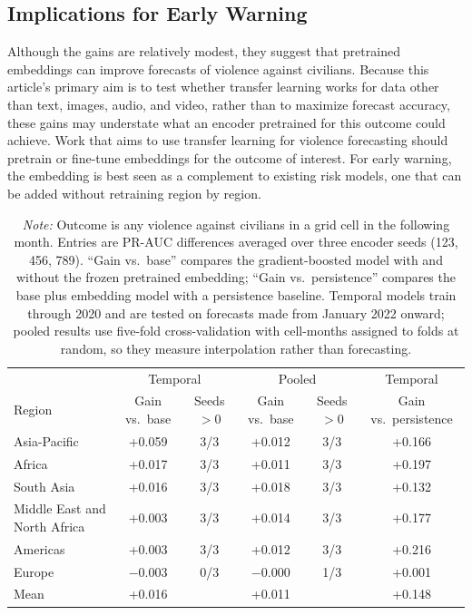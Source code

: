 \documentclass[11pt, letterpaper]{article}
\begin{document}
\subsection{Implications for Early Warning}
Although the gains are relatively modest, they suggest that pretrained embeddings can improve forecasts of violence against civilians. Because this article's primary aim is to test whether transfer learning works for data other than text, images, audio, and video, rather than to maximize forecast accuracy, these gains may understate what an encoder pretrained for this outcome could achieve. Work that aims to use transfer learning for violence forecasting should pretrain or fine-tune embeddings for the outcome of interest. For early warning, the embedding is best seen as a complement to existing risk models, one that can be added without retraining region by region.

\begin{table}[!htbp]
\centering
\caption{Embedding Gain for Forecasting Violence Against Civilians}
\label{tab:civilian_remap}
\begin{tabular}{lccccc}
\hline
& \multicolumn{2}{c}{Temporal} & \multicolumn{2}{c}{Pooled} & Temporal \\
Region & Gain vs.\ base & Seeds $>0$ & Gain vs.\ base & Seeds $>0$ & Gain vs.\ persistence \\
\hline
Asia-Pacific & +0.059 & 3/3 & +0.012 & 3/3 & +0.166 \\
Africa & +0.017 & 3/3 & +0.011 & 3/3 & +0.197 \\
South Asia & +0.016 & 3/3 & +0.018 & 3/3 & +0.132 \\
Middle East and North Africa & +0.003 & 3/3 & +0.014 & 3/3 & +0.177 \\
Americas & +0.003 & 3/3 & +0.012 & 3/3 & +0.216 \\
Europe & $-$0.003 & 0/3 & $-$0.000 & 1/3 & +0.001 \\
\hline
Mean & +0.016 & & +0.011 & & +0.148 \\
\hline
\end{tabular}
\caption*{\footnotesize \textit{Note:} Outcome is any violence against civilians in a grid cell in the following month. Entries are PR-AUC differences averaged over three encoder seeds (123, 456, 789). ``Gain vs.\ base'' compares the gradient-boosted model with and without the frozen pretrained embedding; ``Gain vs.\ persistence'' compares the base plus embedding model with a persistence baseline. Temporal models train through 2020 and are tested on forecasts made from January 2022 onward; pooled results use five-fold cross-validation with cell-months assigned to folds at random, so they measure interpolation rather than forecasting.}
\end{table}
\end{document}
